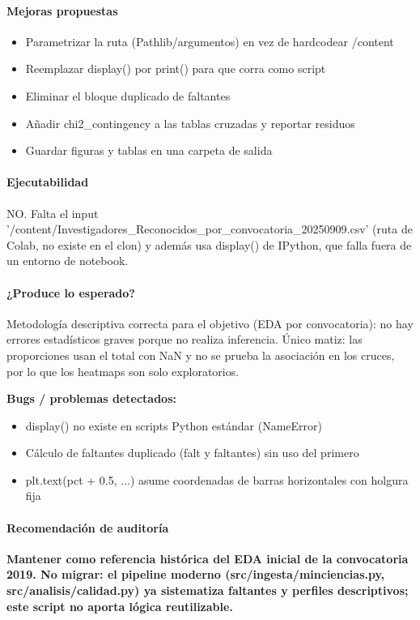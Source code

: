 \paragraph{Mejoras propuestas}
\begin{itemize}
  \item Parametrizar la ruta (Pathlib/argumentos) en vez de hardcodear /content
  \item Reemplazar display() por print() para que corra como script
  \item Eliminar el bloque duplicado de faltantes
  \item Añadir chi2\_contingency a las tablas cruzadas y reportar residuos
  \item Guardar figuras y tablas en una carpeta de salida
\end{itemize}

\paragraph{Ejecutabilidad}
NO. Falta el input '/content/Investigadores\_Reconocidos\_por\_convocatoria\_20250909.csv' (ruta de Colab, no existe en el clon) y además usa display() de IPython, que falla fuera de un entorno de notebook.

\paragraph{¿Produce lo esperado?}
Metodología descriptiva correcta para el objetivo (EDA por convocatoria): no hay errores estadísticos graves porque no realiza inferencia. Único matiz: las proporciones usan el total con NaN y no se prueba la asociación en los cruces, por lo que los heatmaps son solo exploratorios.

\begin{tcolorbox}[riesgo]
\textbf{Bugs / problemas detectados:}
\begin{itemize}
  \item display() no existe en scripts Python estándar (NameError)
  \item Cálculo de faltantes duplicado (falt y faltantes) sin uso del primero
  \item plt.text(pct + 0.5, ...) asume coordenadas de barras horizontales con holgura fija
\end{itemize}
\end{tcolorbox}

\paragraph{Recomendación de auditoría}
\textbf{Mantener como referencia histórica del EDA inicial de la convocatoria 2019. No migrar: el pipeline moderno (src/ingesta/minciencias.py, src/analisis/calidad.py) ya sistematiza faltantes y perfiles descriptivos; este script no aporta lógica reutilizable.}


